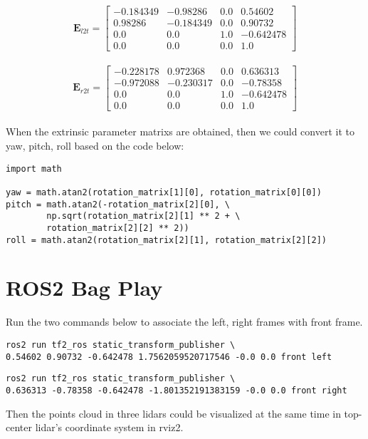 \documentclass[
	letterpaper,
	10pt, 
]{CSUniSchoolLabReport}
\begin{document}
\begin{equation}
\bm{E}_{l2t} = \begin{bmatrix}
-0.184349 & -0.98286 & 0.0 & 0.54602 \\
0.98286 & -0.184349 & 0.0 & 0.90732 \\
0.0 & 0.0 & 1.0 & -0.642478 \\
0.0 & 0.0 & 0.0 & 1.0 
\end{bmatrix}
\end{equation} \\


\begin{equation}
\bm{E}_{r2t} = \begin{bmatrix}
-0.228178 & 0.972368 & 0.0 & 0.636313 \\
-0.972088 & -0.230317 & 0.0 & -0.78358 \\
0.0 & 0.0 & 1.0 & -0.642478 \\
0.0 & 0.0 & 0.0 & 1.0 
\end{bmatrix}
\end{equation} \\

When the extrinsic parameter matrixs are obtained, then we could convert it to yaw, pitch, roll based on the code below:


\begin{verbatim}
import math

yaw = math.atan2(rotation_matrix[1][0], rotation_matrix[0][0])
pitch = math.atan2(-rotation_matrix[2][0], \
        np.sqrt(rotation_matrix[2][1] ** 2 + \
        rotation_matrix[2][2] ** 2))
roll = math.atan2(rotation_matrix[2][1], rotation_matrix[2][2])
\end{verbatim}


\section{ROS2 Bag Play}
Run the two commands below to associate the left, right frames with front frame.
\begin{verbatim}
ros2 run tf2_ros static_transform_publisher \
0.54602 0.90732 -0.642478 1.7562059520717546 -0.0 0.0 front left
\end{verbatim}

\begin{verbatim}
ros2 run tf2_ros static_transform_publisher \
0.636313 -0.78358 -0.642478 -1.801352191383159 -0.0 0.0 front right
\end{verbatim}

Then the points cloud in three lidars could be visualized at the same time in top-center lidar's coordinate system in rviz2.
\end{document}
